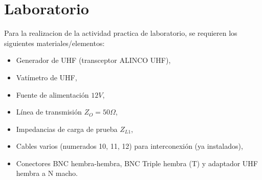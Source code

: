 \chapter{Laboratorio}
  Para la realizacion de la actividad practica de laboratorio, se requieren los siguientes materiales/elementos:
  \begin{itemize}
    \item Generador de UHF (transceptor ALINCO UHF),
    \item Vatímetro de UHF,
    \item Fuente de alimentación $12V$,
    \item Línea de transmisión $Z_O = 50 \Omega$,
    \item Impedancias de carga de prueba $Z_{L1}$,
    \item Cables varios (numerados 10, 11, 12) para interconexión (ya instalados),
    \item Conectores BNC hembra-hembra, BNC Triple hembra (T) y adaptador UHF hembra a N macho.
  \end{itemize}

